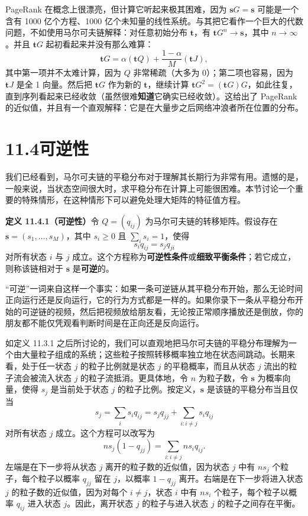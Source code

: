 \documentclass[UTF8, 12pt, fontset=fandol, oneside]{ctexart}
\begin{document}
PageRank 在概念上很漂亮，但计算它听起来极其困难，因为 $\mathbf sG=\mathbf s$ 可能是一个含有 1000 亿个方程、1000 亿个未知量的线性系统。与其把它看作一个巨大的代数问题，不如使用马尔可夫链解释：对任意初始分布 $\mathbf t$，有 $\mathbf tG^n\to\mathbf s$，其中 $n\to\infty$。并且 $\mathbf tG$ 起初看起来并没有那么难算：
\[
  \mathbf tG
  =
  \alpha(\mathbf tQ)+\frac{1-\alpha}{M}(\mathbf tJ),
\]
其中第一项并不太难计算，因为 $Q$ 非常稀疏（大多为 0）；第二项也容易，因为 $\mathbf tJ$ 是全 1 向量。然后把 $\mathbf tG$ 作为新的 $\mathbf t$，继续计算 $\mathbf tG^2=(\mathbf tG)G$，如此往复，直到序列看起来已经收敛（虽然很难\textbf{知道}它确实已经收敛）。这给出了 PageRank 的近似值，并且有一个直观解释：它是在大量步之后网络冲浪者所在位置的分布。

\section*{11.4\quad 可逆性}

我们已经看到，马尔可夫链的平稳分布对于理解其长期行为非常有用。遗憾的是，一般来说，当状态空间很大时，求平稳分布在计算上可能很困难。本节讨论一个重要的特殊情形，在这种情形下可以避免处理大矩阵的特征值方程。

\noindent\textbf{定义 11.4.1（可逆性）}\quad 令 $Q=(q_{ij})$ 为马尔可夫链的转移矩阵。假设存在 $\mathbf s=(s_1,\ldots,s_M)$，其中 $s_i\ge0$ 且 $\sum_i s_i=1$，使得
\[
  s_iq_{ij}=s_jq_{ji}
\]
对所有状态 $i$ 与 $j$ 成立。这个方程称为\textbf{可逆性条件}或\textbf{细致平衡条件}；若它成立，则称该链相对于 $\mathbf s$ 是\textbf{可逆}的。

“可逆”一词来自这样一个事实：如果一条可逆链从其平稳分布开始，那么无论时间正向运行还是反向运行，它的行为方式都是一样的。如果你录下一条从平稳分布开始的可逆链的视频，然后把视频放给朋友看，无论按正常顺序播放还是倒放，你的朋友都不能仅凭观看判断时间是在正向还是反向运行。

如定义 11.3.1 之后所讨论的，我们可以直观地把马尔可夫链的平稳分布理解为一个由大量粒子组成的系统；这些粒子按照转移概率独立地在状态间跳动。长期来看，处于任一状态 $j$ 的粒子比例就是状态 $j$ 的平稳概率，而且从状态 $j$ 流出的粒子流会被流入状态 $j$ 的粒子流抵消。更具体地，令 $n$ 为粒子数，令 $\mathbf s$ 为概率向量，使得 $s_j$ 是当前处于状态 $j$ 的粒子比例。按定义，$\mathbf s$ 是该链的平稳分布当且仅当
\[
  s_j=\sum_i s_iq_{ij}=s_jq_{jj}+\sum_{i:i\ne j}s_iq_{ij}
\]
对所有状态 $j$ 成立。这个方程可以改写为
\[
  ns_j(1-q_{jj})=\sum_{i:i\ne j}ns_iq_{ij}.
\]
左端是在下一步将从状态 $j$ 离开的粒子数的近似值，因为状态 $j$ 中有 $ns_j$ 个粒子，每个粒子以概率 $q_{jj}$ 留在 $j$，以概率 $1-q_{jj}$ 离开。右端是在下一步将进入状态 $j$ 的粒子数的近似值，因为对每个 $i\ne j$，状态 $i$ 中有 $ns_i$ 个粒子，每个粒子以概率 $q_{ij}$ 进入状态 $j$。因此，离开状态 $j$ 的粒子与进入状态 $j$ 的粒子之间存在平衡。
\end{document}
